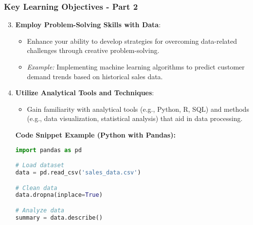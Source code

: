 \documentclass{beamer}
\begin{document}
\begin{frame}
    \frametitle{Key Learning Objectives - Part 2}
    \begin{enumerate}
        \setcounter{enumi}{2} %
        \item \textbf{Employ Problem-Solving Skills with Data}:
            \begin{itemize}
                \item Enhance your ability to develop strategies for overcoming data-related challenges through creative problem-solving.
                \item \textit{Example:} Implementing machine learning algorithms to predict customer demand trends based on historical sales data.
            \end{itemize}

        \item \textbf{Utilize Analytical Tools and Techniques}:
            \begin{itemize}
                \item Gain familiarity with analytical tools (e.g., Python, R, SQL) and methods (e.g., data visualization, statistical analysis) that aid in data processing.
            \end{itemize}
            \textbf{Code Snippet Example (Python with Pandas):}
            \begin{lstlisting}[language=Python]
import pandas as pd

# Load dataset
data = pd.read_csv('sales_data.csv')

# Clean data
data.dropna(inplace=True)

# Analyze data
summary = data.describe()
            \end{lstlisting}
    \end{enumerate}
\end{frame}
\end{document}
